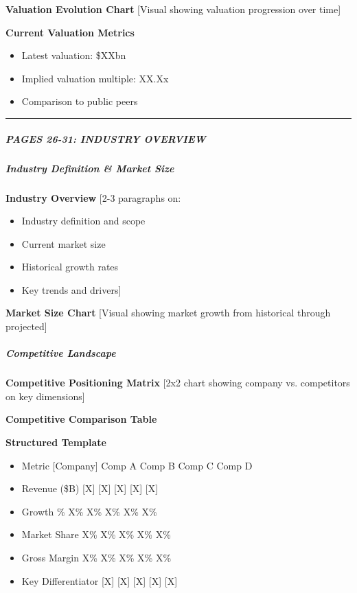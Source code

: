 \documentclass[11pt]{article}
\begin{document}
\textbf{Valuation Evolution Chart} [Visual showing valuation progression over time]


\textbf{Current Valuation Metrics}

\begin{itemize}[leftmargin=*,itemsep=2pt,topsep=2pt]
\item {} Latest valuation: \$XXbn
\item {} Implied valuation multiple: XX.Xx
\item {} Comparison to public peers
\end{itemize}

\vspace{0.5em}\hrule\vspace{0.5em}

\subparagraph{PAGES 26-31: INDUSTRY OVERVIEW}\mbox{}\par

\subparagraph{Industry Definition \& Market Size}\mbox{}\par

\textbf{Industry Overview} [2-3 paragraphs on:

\begin{itemize}[leftmargin=*,itemsep=2pt,topsep=2pt]
\item {} Industry definition and scope
\item {} Current market size
\item {} Historical growth rates
\item {} Key trends and drivers]
\end{itemize}

\textbf{Market Size Chart} [Visual showing market growth from historical through projected]


\subparagraph{Competitive Landscape}\mbox{}\par

\textbf{Competitive Positioning Matrix} [2x2 chart showing company vs. competitors on key dimensions]


\textbf{Competitive Comparison Table}

\textbf{Structured Template}
\begin{itemize}[leftmargin=*,itemsep=2pt,topsep=2pt]
\item {} Metric [Company] Comp A Comp B Comp C Comp D
\item {} Revenue (\$B) [X] [X] [X] [X] [X]
\item {} Growth \% X\% X\% X\% X\% X\%
\item {} Market Share X\% X\% X\% X\% X\%
\item {} Gross Margin X\% X\% X\% X\% X\%
\item {} Key Differentiator [X] [X] [X] [X] [X]
\end{itemize}
\end{document}
